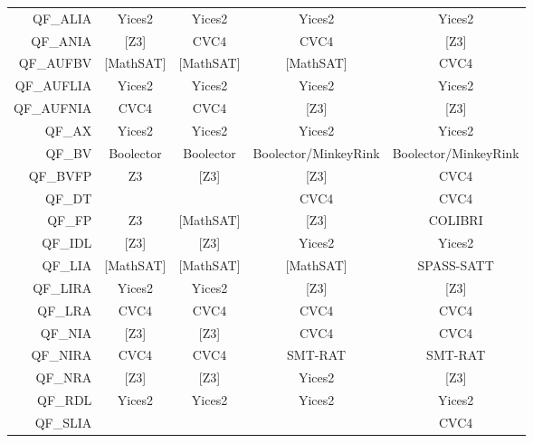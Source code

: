 \begin{table}
{\begin{tabular}{r@{\hskip 3em}c@{\hskip 2em}c@{\hskip 2em}c@{\hskip 2em}c}
QF\_ALIA     & {Yices2}        & {Yices2}        & {Yices2}               & {Yices2}              \\
QF\_ANIA     & {{[}Z3{]}}      & {CVC4}          & {CVC4}                 & {{[}Z3{]}}            \\
QF\_AUFBV    & {{[}MathSAT{]}} & {{[}MathSAT{]}} & {{[}MathSAT{]}}        & {CVC4}                \\
QF\_AUFLIA   & {Yices2}        & {Yices2}        & {Yices2}               & {Yices2}              \\
QF\_AUFNIA   & {CVC4}          & {CVC4}          & {{[}Z3{]}}             & {{[}Z3{]}}            \\
QF\_AX       & {Yices2}        & {Yices2}        & {Yices2}               & {Yices2}              \\
QF\_BV       & {Boolector}     & {Boolector}     & {Boolector/MinkeyRink} & {Boolector/MinkeyRink}\\
QF\_BVFP     & {Z3}            & {{[}Z3{]}}      & {{[}Z3{]}}             & {CVC4}                \\
QF\_DT       &                 &                 & {CVC4}                 & {CVC4}                \\
QF\_FP       & {Z3}            & {{[}MathSAT{]}} & {{[}Z3{]}}             & {COLIBRI}             \\
QF\_IDL      & {{[}Z3{]}}      & {{[}Z3{]}}      & {Yices2}               & {Yices2}              \\
QF\_LIA      & {{[}MathSAT{]}} & {{[}MathSAT{]}} & {{[}MathSAT{]}}        & {SPASS-SATT}          \\
QF\_LIRA     & {Yices2}        & {Yices2}        & {{[}Z3{]}}             & {{[}Z3{]}}            \\
QF\_LRA      &  {CVC4}         & {CVC4}          & {CVC4}                 & {CVC4}                \\
QF\_NIA      & {{[}Z3{]}}      & {{[}Z3{]}}      & {CVC4}                 & {CVC4}                \\
QF\_NIRA     & {CVC4}          & {CVC4}          & {SMT-RAT}              & {SMT-RAT}             \\
QF\_NRA      & {{[}Z3{]}}      & {{[}Z3{]}}      & {Yices2}               & {{[}Z3{]}}            \\
QF\_RDL      & {Yices2}        & {Yices2}        & {Yices2}               & {Yices2}              \\
QF\_SLIA     &                 &                 &                        & {CVC4}                \\

\end{tabular}}
\end{table}

